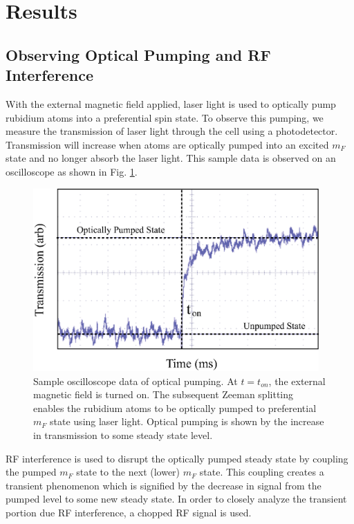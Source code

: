 
\section{Results}\label{results}

\subsection{Observing Optical Pumping and RF Interference}\label{ObservingOpticalPumpingandRFInterference}

With the external magnetic field applied, laser light is used to optically pump rubidium atoms into a preferential spin state.  To observe this pumping, we measure the transmission of laser light through the cell using a photodetector.  Transmission will increase when atoms are optically pumped into an excited $m_F$ state and no longer absorb the laser light. This sample data is observed on an oscilloscope as shown in Fig. \ref{fig:raw_data}.
\begin{figure}[htbp]
\begin{center}
\includegraphics[height=70mm]{./figures/raw_data.eps}
\caption{\small{Sample oscilloscope data of optical pumping. At $t=t_{on}$, the external magnetic field is turned on. The subsequent Zeeman splitting enables the rubidium atoms to be optically pumped to preferential $m_F$ state using laser light.  Optical pumping is shown by the increase in transmission to some steady state level.}}
\label{fig:raw_data}
\end{center}
\end{figure}
RF interference is used to disrupt the optically pumped steady state by coupling the pumped $m_F$ state to the next (lower) $m_F$ state.  This coupling creates a transient phenomenon which is signified by the decrease in signal from the pumped level to some new steady state.  In order to closely analyze the transient portion due RF interference, a chopped RF signal is used.  
